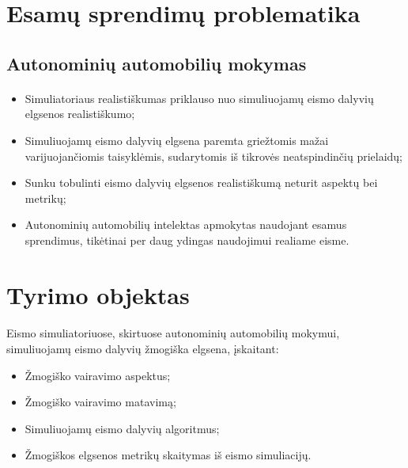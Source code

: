 \documentclass{beamer}
\begin{document}
\section{Esamų sprendimų problematika}

\subsection{Autonominių automobilių mokymas}
\begin{frame}{\insertsection}
\framesubtitle{\insertsubsection}
\begin{itemize}
	\item Simuliatoriaus realistiškumas priklauso nuo simuliuojamų eismo dalyvių elgsenos realistiškumo;
	\item Simuliuojamų eismo dalyvių elgsena paremta griežtomis mažai varijuojančiomis taisyklėmis, sudarytomis iš tikrovės neatspindinčių prielaidų;
	\item Sunku tobulinti eismo dalyvių elgsenos realistiškumą neturit aspektų bei metrikų;
	\item Autonominių automobilių intelektas apmokytas naudojant esamus sprendimus, tikėtinai per daug ydingas naudojimui realiame eisme.
\end{itemize}
\end{frame}



\section{Tyrimo objektas}


\begin{frame}{\insertsection}
\framesubtitle{\insertsubsection}
Eismo simuliatoriuose, skirtuose autonominių automobilių mokymui, simuliuojamų eismo dalyvių žmogiška elgsena, įskaitant:
\begin{itemize}
	\item Žmogiško vairavimo aspektus;
	\item Žmogiško vairavimo matavimą;
	\item Simuliuojamų eismo dalyvių algoritmus;
	\item Žmogiškos elgsenos metrikų skaitymas iš eismo simuliacijų.
\end{itemize}
\end{frame}
\end{document}
